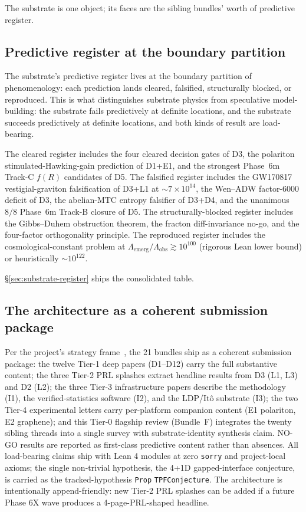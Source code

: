 \documentclass[aps,prd,reprint,nofootinbib,superscriptaddress]{revtex4-2}
\begin{document}
The substrate is one object; its faces are the sibling bundles'
worth of predictive register.

\subsection{Predictive register at the boundary partition}

The substrate's predictive register lives at the boundary partition
of phenomenology: each prediction lands cleared, falsified,
structurally blocked, or reproduced. This is what distinguishes
substrate physics from speculative model-building: the substrate
fails predictively at definite locations, and the substrate succeeds
predictively at definite locations, and both kinds of result are
load-bearing.

The cleared register includes the four cleared decision gates of D3,
the polariton stimulated-Hawking-gain prediction of D1+E1, and the
strongest Phase~6m Track-C $f(R)$ candidates of D5. The falsified
register includes the GW170817 vestigial-graviton falsification of
D3+L1 at $\sim 7\times 10^{14}$, the Wen--ADW factor-$6000$ deficit
of D3, the abelian-MTC entropy falsifier of D3+D4, and the unanimous
$8/8$ Phase~6m Track-B closure of D5. The structurally-blocked
register includes the Gibbs--Duhem obstruction theorem, the
fracton diff-invariance no-go, and the four-factor orthogonality
principle. The reproduced register includes the cosmological-constant
problem at $\Lambda_{\mathrm{emerg}}/\Lambda_{\mathrm{obs}} \gtrsim
10^{100}$ (rigorous Lean lower bound) or heuristically $\sim
10^{122}$.

\S\ref{sec:substrate-register} ships the consolidated table.

\subsection{The architecture as a coherent submission package}

Per the project's strategy frame~\cite{Roehm2026Strategy}, the 21
bundles ship as a coherent submission package: the twelve Tier-1 deep
papers (D1--D12) carry the full substantive content; the three Tier-2
PRL splashes extract headline results from D3 (L1, L3) and D2 (L2);
the three Tier-3 infrastructure papers describe the methodology (I1),
the verified-statistics software (I2), and the LDP/It\^o substrate
(I3); the two Tier-4 experimental letters carry per-platform
companion content (E1 polariton, E2 graphene); and this Tier-0
flagship review (Bundle~F) integrates the twenty sibling threads
into a single survey with substrate-identity synthesis claim. NO-GO results are reported as first-class predictive
content rather than absences. All load-bearing claims ship with Lean
4 modules at zero \texttt{sorry} and \axiomcount{} project-local
axioms; the single non-trivial hypothesis, the 4+1D
gapped-interface conjecture, is carried as the tracked-hypothesis
\texttt{Prop} \texttt{TPFConjecture}. The architecture is
intentionally append-friendly: new
Tier-2 PRL splashes can be added if a future Phase 6X wave produces
a 4-page-PRL-shaped headline.
\end{document}
